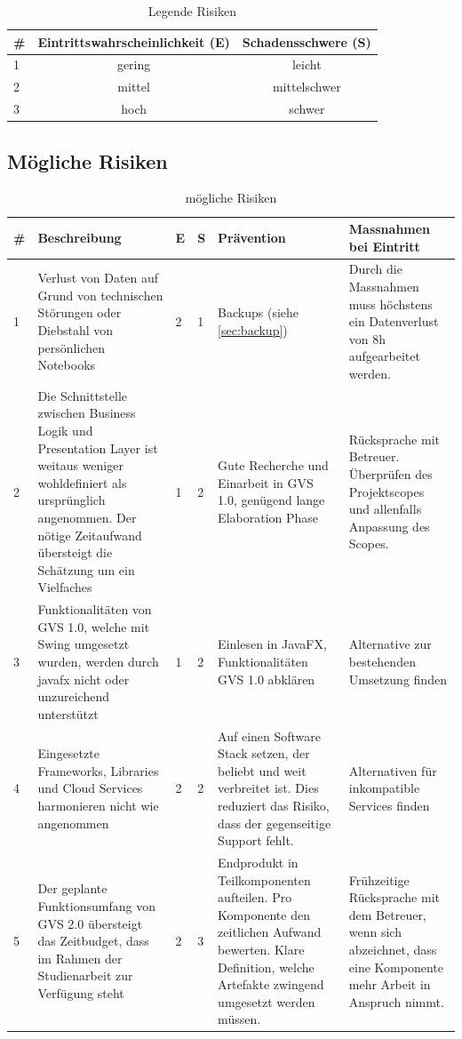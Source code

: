 \documentclass[11pt,a4paper,english,oneside]{book}
\numberwithin{equation}{chapter}
\begin{document}
	\begin{table}[h!]
		\centering
		\begin{tabular}{l c c}
			\toprule 
			\# & Eintrittswahrscheinlichkeit (E) & Schadensschwere (S) \\
			\toprule 
			1 & gering & leicht  \\
			2 & mittel & mittelschwer \\
			3 & hoch & schwer \\
			\bottomrule 
		\end{tabular} 
		\caption{Legende Risiken} 
	\end{table}
	\begin{landscape}		
		\subsection{Mögliche Risiken}
		\begin{table}[h!]
			\centering
			\begin{tabularx}{\linewidth}{l X l l X X}
				\toprule 
				\# & Beschreibung & E & S & Prävention & Massnahmen bei Eintritt \\
				\toprule 
				1 & Verlust von Daten auf Grund von technischen Störungen oder Diebstahl von persönlichen Notebooks & 2 & 1 & Backups (siehe \ref{sec:backup}) & Durch die Massnahmen muss höchstens ein Datenverlust von 8h aufgearbeitet werden. \\
				\midrule
				2 & Die Schnittstelle zwischen Business Logik und Presentation Layer ist weitaus weniger wohldefiniert als ursprünglich angenommen. Der nötige Zeitaufwand übersteigt die Schätzung um ein Vielfaches & 1 & 2 & Gute Recherche und Einarbeit in GVS 1.0, genügend lange Elaboration Phase & Rücksprache mit Betreuer. Überprüfen des Projektscopes und allenfalls Anpassung des Scopes. \\
				\midrule
				3 & Funktionalitäten von GVS 1.0, welche mit Swing umgesetzt wurden, werden durch \gls{javafx} nicht oder unzureichend unterstützt & 1 & 2 & Einlesen in JavaFX, Funktionalitäten GVS 1.0 abklären & Alternative zur bestehenden Umsetzung finden \\
				\midrule
				4 & Eingesetzte Frameworks, Libraries und Cloud Services harmonieren nicht wie angenommen & 2 & 2 & Auf einen Software Stack setzen, der beliebt und weit verbreitet ist. Dies reduziert das Risiko, dass der gegenseitige Support fehlt. & Alternativen für inkompatible Services finden \\  
				\midrule 
				5 & Der geplante Funktionsumfang von GVS 2.0 übersteigt das Zeitbudget, dass im Rahmen der Studienarbeit zur Verfügung steht & 2 & 3 & Endprodukt in Teilkomponenten aufteilen. Pro Komponente den zeitlichen Aufwand bewerten. Klare Definition, welche Artefakte zwingend umgesetzt werden müssen. & Frühzeitige Rücksprache mit dem Betreuer, wenn sich abzeichnet, dass eine Komponente mehr Arbeit in Anspruch nimmt. \\  
				\bottomrule 
			\end{tabularx} 
			\caption{mögliche Risiken} 
		\end{table}
	\end{landscape}
	
\end{document}
